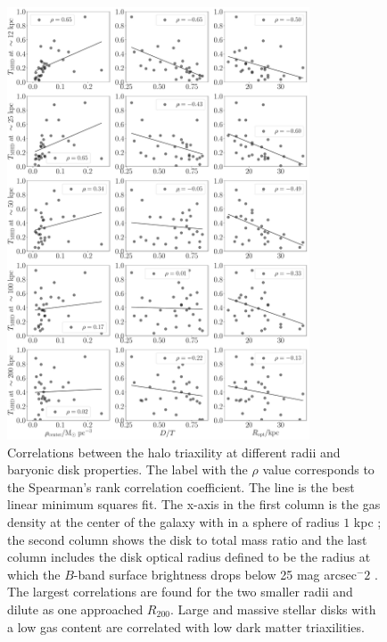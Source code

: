 \documentclass[a4paper,fleqn,usenatbib]{mnras}
\begin{document}
\begin{figure}
\begin{center}
\includegraphics[width=0.8\textwidth]{correlation_T_MHD_disk.pdf}
\end{center}
\caption{Correlations between the halo triaxility at different radii
  and baryonic disk properties. 
  The label with the $\rho$ value corresponds to the Spearman's rank
  correlation coefficient.
  The line is the best linear minimum squares fit.
  The x-axis in the first column is the gas density at the center of
  the galaxy with in a sphere of radius  $1$ kpc \citep{Pakmor17};
  the second column shows the disk to total mass ratio and the last
  column includes the disk optical radius defined to be the radius at which the
  $B$-band surface brightness drops below 25 mag arcsec$^-2$ \citep{auriga}.
  The largest correlations are found for the two smaller radii and
  dilute as one approached $R_{200}$.
  Large and massive stellar disks with a low gas content are
  correlated with low dark matter triaxilities.}
\label{fig:disk_correlations}
\end{figure}
\end{document}
